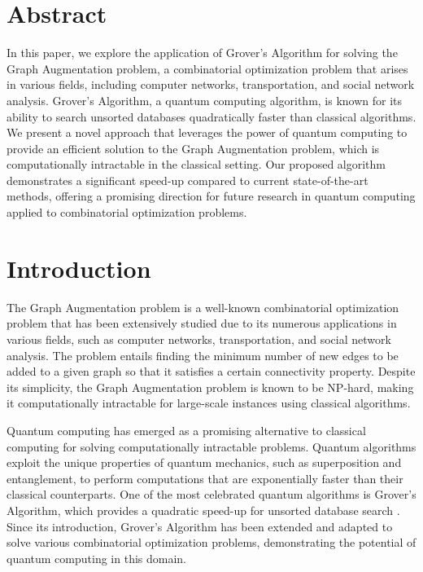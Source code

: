 \section*{Abstract}
In this paper, we explore the application of Grover's Algorithm for solving the Graph Augmentation problem, a combinatorial optimization problem that arises in various fields, including computer networks, transportation, and social network analysis. Grover's Algorithm, a quantum computing algorithm, is known for its ability to search unsorted databases quadratically faster than classical algorithms. We present a novel approach that leverages the power of quantum computing to provide an efficient solution to the Graph Augmentation problem, which is computationally intractable in the classical setting. Our proposed algorithm demonstrates a significant speed-up compared to current state-of-the-art methods, offering a promising direction for future research in quantum computing applied to combinatorial optimization problems.

\section{Introduction}
\label{sec:introduction}

The Graph Augmentation problem is a well-known combinatorial optimization problem that has been extensively studied due to its numerous applications in various fields, such as computer networks, transportation, and social network analysis. The problem entails finding the minimum number of new edges to be added to a given graph so that it satisfies a certain connectivity property. Despite its simplicity, the Graph Augmentation problem is known to be NP-hard, making it computationally intractable for large-scale instances using classical algorithms.

Quantum computing has emerged as a promising alternative to classical computing for solving computationally intractable problems. Quantum algorithms exploit the unique properties of quantum mechanics, such as superposition and entanglement, to perform computations that are exponentially faster than their classical counterparts. One of the most celebrated quantum algorithms is Grover's Algorithm, which provides a quadratic speed-up for unsorted database search \cite{grover1996fast}. Since its introduction, Grover's Algorithm has been extended and adapted to solve various combinatorial optimization problems, demonstrating the potential of quantum computing in this domain.

